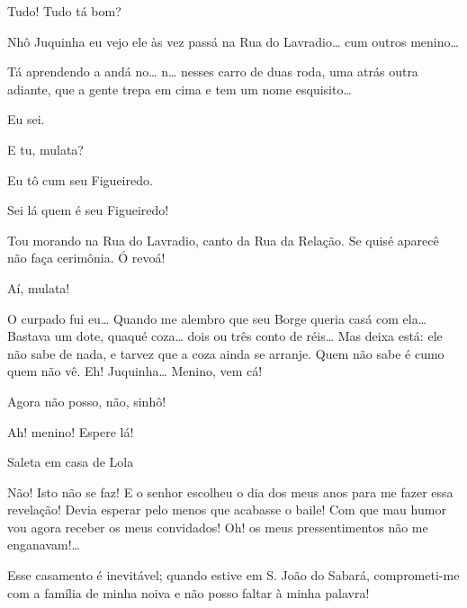 Tudo! Tudo tá bom?

 Nhô Juquinha eu vejo ele às vez passá na Rua do Lavradio\ldots{} cum
outros menino\ldots{}

 Tá aprendendo a andá no\ldots{} n\ldots{} nesses carro de duas roda, uma
atrás outra adiante, que a gente trepa em cima e tem um nome esquisito\ldots{}

 Eu sei.

 E tu, mulata?

 Eu tô cum seu Figueiredo.

 Sei lá quem é seu Figueiredo!

 Tou morando na Rua do Lavradio, canto da Rua da Relação.
 Se quisé aparecê não faça cerimônia.  Ó revoá!

 Aí, mulata!


 O curpado fui eu\ldots{} Quando me alembro que seu Borge queria casá
com ela\ldots{} Bastava um dote, quaqué coza\ldots{} dois ou três conto de réis\ldots{} Mas
deixa está: ele não sabe de nada, e tarvez que a coza ainda se arranje. Quem não sabe é
cumo quem não vê.  Eh!
Juquinha\ldots{} Menino, vem cá!

 Agora não posso, não, sinhô! 

 Ah! menino! Espere lá! 


Saleta em casa de Lola



 Não! Isto não se faz! E o senhor escolheu o dia dos meus anos para
me fazer essa revelação! Devia esperar pelo menos que acabasse o baile! Com
que mau humor vou agora receber os meus convidados!  Oh!
os meus pressentimentos não me enganavam!\ldots{}

 Esse casamento é inevitável; quando estive em S. João do Sabará,
comprometi-me com a família de minha noiva e não posso faltar à minha
palavra!

